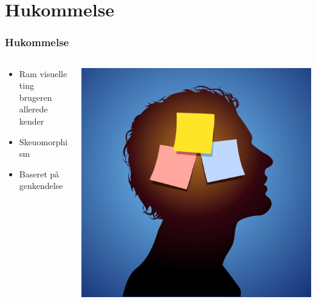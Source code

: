 \documentclass{beamer}
\begin{document}
\section{Hukommelse}
\begin{frame}
\frametitle{Hukommelse}
  \begin{columns}[T]
    \begin{column}{.5\textwidth}
	  \begin{itemize}
		\item Ram visuelle ting brugeren allerede kender	
		\item Skeuomorphism
		\item Baseret på genkendelse
	  \end{itemize}
    \end{column}
    \begin{column}{.4\textwidth}
      \includegraphics[width=\textwidth]{memory.jpg}
    \end{column}
  \end{columns}
\end{frame}
\end{document}
